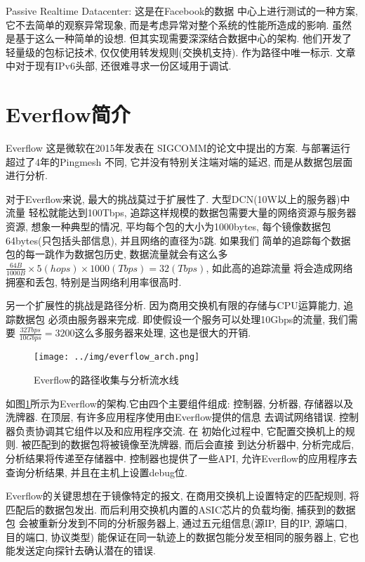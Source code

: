 Passive Realtime Datacenter: \cite{roy2017passive} 这是在Facebook的数据
中心上进行测试的一种方案, 它不去简单的观察异常现象,
而是考虑异常对整个系统的性能所造成的影响. 虽然是基于这么一种简单的设想.
但其实现需要深深结合数据中心的架构. 他们开发了轻量级的包标记技术,
仅仅使用转发规则(交换机支持). 作为路径中唯一标示. 文章中对于现有IPv6头部, 
还很难寻求一份区域用于调试.


\section{Everflow简介}

  Everflow \cite{greenberg2016packet} 这是微软在2015年发表在
SIGCOMM的论文中提出的方案. 与部署运行超过了4年的Pingmesh\cite{guo2015pingmesh}
不同, 它并没有特别关注端对端的延迟, 而是从数据包层面进行分析.

  对于Everflow来说, 最大的挑战莫过于扩展性了. 大型DCN(10W以上的服务器)中流量
轻松就能达到100Tbps, 追踪这样规模的数据包需要大量的网络资源与服务器资源,
想象一种典型的情况, 平均每个包的大小为1000bytes,
每个镜像数据包64bytes(只包括头部信息), 并且网络的直径为5跳. 如果我们
简单的追踪每个数据包的每一跳作为数据包历史, 数据流量就会有这么多
$\frac{64B}{1000B} \times 5(hops) \times 1000(Tbps) = 32(Tbps)$, 如此高的追踪流量
将会造成网络拥塞和丢包, 特别是当网络利用率很高时.

  另一个扩展性的挑战是路径分析. 因为商用交换机有限的存储与CPU运算能力, 追踪数据包
必须由服务器来完成. 即使假设一个服务可以处理10Gbps的流量, 我们需要
$\frac{32Tbps}{10Gbps} = 3200$这么多服务器来处理, 这也是很大的开销.


\begin{figure}
  \centering
  \texttt{[image: ../img/everflow\_arch.png]}
  \caption{Everflow的路径收集与分析流水线}
  \label{fig:everflow_arch}
\end{figure}

  如图\ref{fig:everflow_arch}所示为Everflow的架构.它由四个主要组件组成:
控制器, 分析器, 存储器以及洗牌器. 在顶层, 有许多应用程序使用由Everflow提供的信息
去调试网络错误. 控制器负责协调其它组件以及和应用程序交流. 在
初始化过程中, 它配置交换机上的规则. 被匹配到的数据包将被镜像至洗牌器, 而后会直接
到达分析器中, 分析完成后, 分析结果将传递至存储器中.
控制器也提供了一些API, 允许Everflow的应用程序去查询分析结果, 并且在主机上设置debug位.

  Everflow的关键思想在于镜像特定的报文, 在商用交换机上设置特定的匹配规则, 将匹配后的数据包发出.
而后利用交换机内置的ASIC芯片的负载均衡, 捕获到的数据包
会被重新分发到不同的分析服务器上, 通过五元组信息(源IP, 目的IP, 源端口, 目的端口, 协议类型)
能保证在同一轨迹上的数据包能分发至相同的服务器上,
它也能发送定向探针去确认潜在的错误.

